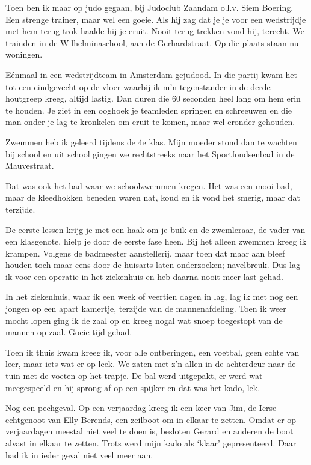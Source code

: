 \documentclass[10pt,twoside,openright]{memoir}
\begin{document}
Toen ben ik maar op judo gegaan, bij Judoclub Zaandam o.l.v. Siem Boering. Een strenge trainer, maar wel een goeie. Als hij zag dat je je voor een wedstrijdje met hem terug trok haalde hij je eruit. Nooit terug trekken vond hij, terecht. We trainden in de Wilhelminaschool, aan de Gerhardstraat. Op die plaats staan nu woningen.

Eénmaal in een wedstrijdteam in Amsterdam gejudood. In die partij kwam het tot een eindgevecht op de vloer waarbij ik m’n tegenstander in de derde houtgreep kreeg, altijd lastig. Dan duren die 60 seconden heel lang om hem erin te houden. Je ziet in een ooghoek je teamleden springen en schreeuwen en die man onder je lag te kronkelen om eruit te komen, maar wel eronder gehouden. 

Zwemmen heb ik geleerd tijdens de 4e klas. Mijn moeder stond dan te wachten bij school en uit school gingen we rechtstreeks naar het Sportfondsenbad in de Mauvestraat. 

Dat was ook het bad waar we schoolzwemmen kregen. Het was een mooi bad, maar de kleedhokken beneden waren nat, koud en ik vond het smerig, maar dat terzijde. 

De eerste lessen krijg je met een haak om je buik en de zwemleraar, de vader van een klasgenote, hielp je door de eerste fase heen. Bij het alleen zwemmen kreeg ik krampen. Volgens de badmeester aanstellerij, maar toen dat maar aan bleef houden toch maar eens door de huisarts laten onderzoeken; navelbreuk. Dus lag ik voor een operatie in het ziekenhuis en heb daarna nooit meer last gehad.

In het ziekenhuis, waar ik een week of veertien dagen in lag, lag ik met nog een jongen op een apart kamertje, terzijde van de mannenafdeling. Toen ik weer mocht lopen ging ik de zaal op en kreeg nogal wat snoep toegestopt van de mannen op zaal. Goeie tijd gehad.

Toen ik thuis kwam kreeg ik, voor alle ontberingen, een voetbal, geen echte van leer, maar iets wat er op leek. We zaten met z’n allen in de achterdeur naar de tuin met de voeten op het trapje. De bal werd uitgepakt, er werd wat meegespeeld en hij sprong af op een spijker en dat was het kado, lek. 

Nog een pechgeval. Op een verjaardag kreeg ik een keer van Jim, de Ierse echtgenoot van Elly Berends, een zeilboot om in elkaar te zetten. Omdat er op verjaardagen meestal niet veel te doen is, besloten Gerard en anderen de boot alvast in elkaar te zetten. Trots werd mijn kado als ‘klaar’ gepresenteerd. Daar had ik in ieder geval niet veel meer aan.
\end{document}
